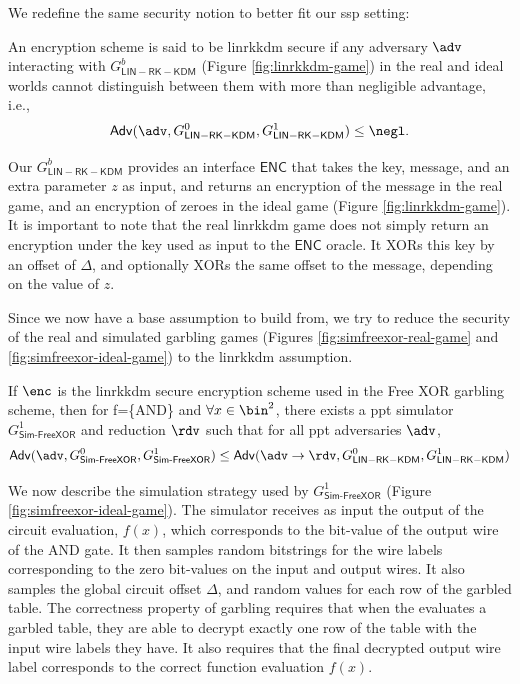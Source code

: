 We redefine the same security notion to better fit our \acrshort{ssp} setting: 
\begin{definition}\label{def:linrkkdmsecurity}
    An encryption scheme is said to be \acrshort{linrkkdm} secure if any adversary $\adv$ interacting with $G^{b}_{\mathsf{LIN-RK-KDM}}$ (Figure \ref{fig:linrkkdm-game}) in the real and ideal worlds cannot distinguish between them with more than negligible advantage, i.e.,
    \[ \mathsf{Adv}(\adv, G^{0}_{\mathsf{LIN-RK-KDM}}, G^{1}_{\mathsf{LIN-RK-KDM}}) \leq \negl \text{.}\]
\end{definition}
Our $G^{b}_{\mathsf{LIN-RK-KDM}}$ provides an interface $\mathsf{ENC}$ that takes the key, message, and an extra parameter $z$ as input, and returns an encryption of the message in the real game, and an encryption of zeroes in the ideal game (Figure \ref{fig:linrkkdm-game}). It is important to note that the real \acrshort{linrkkdm} game does not simply return an encryption under the key used as input to the $\mathsf{ENC}$ oracle. It XORs this key by an offset of $\Delta$, and optionally XORs the same offset to the message, depending on the value of $z$.  

Since we now have a base assumption to build from, we try to reduce the security of the real and simulated garbling games (Figures \ref{fig:simfreexor-real-game} and \ref{fig:simfreexor-ideal-game}) to the \acrshort{linrkkdm} assumption. 
\begin{theorem}\label{thm:reduction}
    If $\enc$ is the \acrshort{linrkkdm} secure encryption scheme used in the Free XOR garbling scheme, then for f=\{AND\} and $\forall x\in \bin^2$, there exists a \acrfull{ppt} simulator $G^1_\mathsf{Sim\text{-}FreeXOR}$ and reduction $\rdv$ such that for all \acrshort{ppt} adversaries $\adv$,
    \[\mathsf{Adv}(\adv, G^0_\mathsf{Sim\text{-}FreeXOR}, G^1_\mathsf{Sim\text{-}FreeXOR}) \leq \mathsf{Adv}(\adv\to\rdv, G^{0}_{\mathsf{LIN-RK-KDM}}, G^{1}_{\mathsf{LIN-RK-KDM}}) \] 
\end{theorem}



We now describe the simulation strategy used by $G^1_\mathsf{Sim\text{-}FreeXOR}$ (Figure \ref{fig:simfreexor-ideal-game}). The simulator receives as input the output of the circuit evaluation, $f(x)$, which corresponds to the bit-value of the output wire of the AND gate. It then samples random bitstrings for the wire labels corresponding to the zero bit-values on the input and output wires. It also samples the global circuit offset $\Delta$, and random values for each row of the garbled table. 
The correctness property of garbling requires that when the \cevaluator evaluates a garbled table, they are able to decrypt exactly one row of the table with the input wire labels they have. It also requires that the final decrypted output wire label corresponds to the correct function evaluation $f(x)$.


